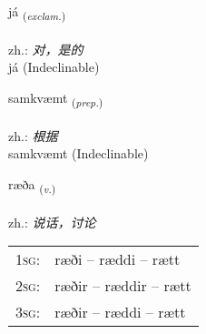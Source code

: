 \documentclass[frontgrid, backgrid]{flacards}\usepackage[]{graphicx}\usepackage[]{xcolor}
\begin{document}
{já \small{\textsubscript{(\textit{exclam.})}} \\[1ex]
\textphonetic{[jauː]} \\
zh.: \emph{对，是的} \\  [2ex]
já (Indeclinable)}


\renewcommand{\flhead}{\vskip5pt \fboxsep=0pt {\small\bfseries\footnotesize Forsetning | 介词}}
\renewcommand{\fcfoot}{\vskip5pt \fboxsep=0pt \hspace{2pt}{\small\bfseries\footnotesize 1K}}

\renewcommand{\blhead}{\vskip5pt {\small\bfseries\footnotesize Forsetning | 介词 }}
\renewcommand{\bcfoot}{\vskip5pt \hspace{2pt}{\small\bfseries\footnotesize 1K}}


{samkvæmt \small{\textsubscript{(\textit{prep.})}} \\[1ex]
\textphonetic{[samkʰvaim̥t]} \\
zh.: \emph{根据} \\  [2ex]
samkvæmt (Indeclinable)}

\renewcommand{\flhead}{\vskip5pt \fboxsep=0pt {\small\bfseries\footnotesize Sagnorð | 动词}}
\renewcommand{\fcfoot}{\vskip5pt \fboxsep=0pt \hspace{2pt}{\small\bfseries\footnotesize 1K}}

\renewcommand{\blhead}{\vskip5pt {\small\bfseries\footnotesize Sagnorð | 动词 }}
\renewcommand{\bcfoot}{\vskip5pt \hspace{2pt}{\small\bfseries\footnotesize 1K}}


{ræða \small{\textsubscript{(\textit{v.})}} \\[1ex] %
\textphonetic{[raiːða]} \\
zh.: \emph{说话，讨论} \\  [2ex]
\renewcommand*{\arraystretch}{0.8}
\begin{tabular}{p{1cm}l}
\textsc{1sg}: & ræði -- ræddi -- rætt \\ 
\textsc{2sg}: & ræðir -- ræddir -- rætt \\ 
\textsc{3sg}: & ræðir -- ræddi -- rætt \\ 
\end{tabular}
}
\end{document}
